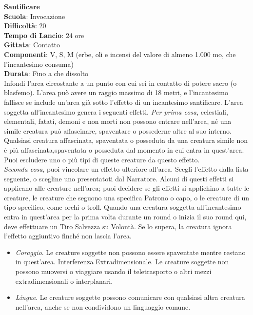 \begin{multicols}{2}
\medskip\textbf{Santificare}\\
\textbf{Scuola}: Invocazione\\
\textbf{Difficoltà}:  20\\
\textbf{Tempo di Lancio}: 24 ore\\
\textbf{Gittata}: Contatto\\
\textbf{Componenti}: V, S, M (erbe, oli e incensi del valore di almeno 1.000 mo, che l'incantesimo consuma)\\
\textbf{Durata}: Fino a che dissolto\\
Infondi l’area circostante a un punto con cui sei in contatto di potere sacro (o blasfemo). L’area può avere un raggio massimo di 18 metri, e l'incantesimo fallisce se include un'area già sotto l’effetto di un incantesimo santificare. L’area soggetta all'incantesimo genera i seguenti effetti.
\textit{Per prima cosa}, celestiali, elementali, fatati, demoni e non morti non possono entrare nell'area, né una simile creatura può affascinare, spaventare o possederne altre al suo interno. Qualsiasi creatura affascinata, spaventata o posseduta da una creatura simile non è più affascinata,spaventata o posseduta dal momento in  cui entra in quest’area. Puoi escludere uno o più tipi di queste creature da questo effetto.\\
\textit{Seconda cosa}, puoi vincolare un effetto ulteriore  all'area. Scegli l’effetto dalla lista seguente, o scegline uno presentatoti dal Narratore. Alcuni di questi effetti si applicano alle creature nell'area; puoi decidere se gli effetti si applichino a tutte le creature, le creature che seguono una specifica Patrono o capo, o le creature di un tipo specifico, come orchi o troll. Quando una creatura soggetta all'incantesimo entra in quest’area per la prima volta durante un round o inizia il suo round qui, deve effettuare un Tiro Salvezza su Volontà. Se lo supera, la creatura ignora l’effetto aggiuntivo finché non lascia l’area.\\
\medskip
\begin{itemize}
\item
\textit{Coraggio}. Le creature soggette non possono essere spaventate mentre restano in quest’area. Interferenza Extradimensionale. Le creature soggette non possono muoversi o viaggiare usando il teletrasporto o altri mezzi extradimensionali o interplanari.
\item
\textit{Lingue}. Le creature soggette possono comunicare con qualsiasi altra creatura nell'area, anche se non condividono un linguaggio comune. 

\end{itemize}
\end{multicols}
